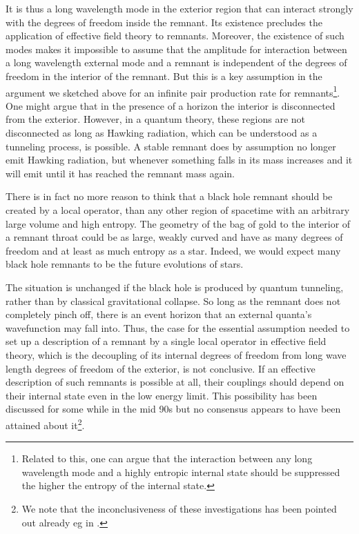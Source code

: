 \documentclass[12pt]{article}
\begin{document}
It is thus a long wavelength mode in the exterior region that can interact strongly with the degrees of freedom inside the remnant.  Its existence precludes the application of effective field theory to remnants.  Moreover, the existence of such modes makes it impossible to assume that the amplitude for interaction between a long wavelength external mode and a remnant is independent of the degrees of freedom in the interior of the remnant.  But this is a key assumption in the argument we sketched above for an infinite pair production rate for 
remnants\footnote{Related to this, one can argue that 
the interaction between any long wavelength mode and a highly entropic internal state should be suppressed the higher the entropy of the internal state.}. One might argue that in the presence of a horizon the interior is disconnected from the exterior. However, in a quantum theory, these regions are not disconnected as long as Hawking radiation, which can be understood as a tunneling process, is possible. A stable remnant does by assumption
no longer emit Hawking radiation, but whenever something falls in its mass increases and it will emit until it has reached the remnant mass again. 

There is in fact no more reason to think that a black hole remnant should be created by a local operator, than any other region of spacetime with an arbitrary large volume and high entropy. 
The geometry of the bag of gold to the interior of a remnant throat could be as large, weakly curved and have as many degrees of freedom and at least as much entropy as a star. Indeed, we would expect many black hole remnants to be the future evolutions of stars.

The situation is unchanged if the black hole is produced by quantum tunneling, rather than by classical gravitational collapse.  So long as the remnant does not completely pinch off, there is an event horizon that an external quanta's wavefunction may fall into.  
Thus, the case for the essential assumption needed to set up a description of a remnant by a single local operator in effective field theory, which is the 
decoupling of its internal degrees of freedom from long wave length degrees of freedom of the exterior, is not conclusive.
 If an effective description of such remnants 
is possible at all, their couplings should depend on their internal state even in the low energy limit. 
This possibility has been discussed for some
while \cite{Banks:1992mi,Banks:1992is,Banks:1994ph,Giddings:1993km,Giddings:1993vj,Giddings:1994qt} in the mid 90s but
no consensus appears to have been attained about it\footnote{We note that the inconclusiveness of these investigations has 
been pointed out already eg in \cite{Page, Jacobson:1999mi}.}.  
\end{document}
